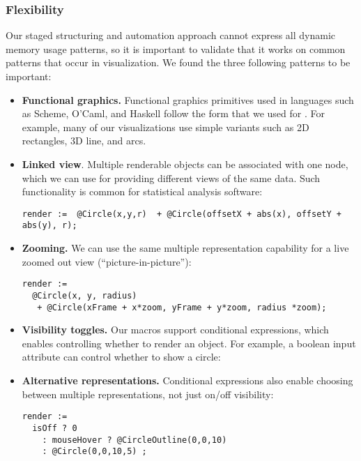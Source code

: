 \subsubsection{Flexibility}
Our staged structuring and automation approach cannot express all dynamic memory usage patterns, so it is important to validate that it works on common patterns that occur in visualization. We found the three following patterns to be important:

\begin{itemize}
\item \textbf{Functional graphics.} Functional graphics primitives used in languages such as Scheme, O'Caml, and Haskell follow the form that we used for . For example, many of our visualizations use simple variants such as 2D rectangles,  3D line, and arcs.
\item \textbf{Linked view}. Multiple renderable objects can be associated with one node, which we can use for providing different views of the same data. Such functionality is common for statistical analysis software:

\begin{lstlisting}[mathescape]
render :=  @Circle(x,y,r)  + @Circle(offsetX + abs(x), offsetY + abs(y), r);
\end{lstlisting}

\item \textbf{Zooming.} We can use the same multiple representation capability for a live zoomed out view (``picture-in-picture''):

\begin{lstlisting}[mathescape]
render :=  
  @Circle(x, y, radius) 
   + @Circle(xFrame + x*zoom, yFrame + y*zoom, radius *zoom);
\end{lstlisting}

\item \textbf{Visibility toggles.} Our macros support conditional expressions, which enables controlling whether to render an object. For example, a boolean input attribute can control whether to show a circle: 
\item \textbf{Alternative representations.} Conditional expressions also enable choosing between multiple representations, not just on/off visibility:
\begin{lstlisting}[mathescape]
render := 
  isOff ? 0
    : mouseHover ? @CircleOutline(0,0,10) 
    : @Circle(0,0,10,5) ;
\end{lstlisting}

\end{itemize}

